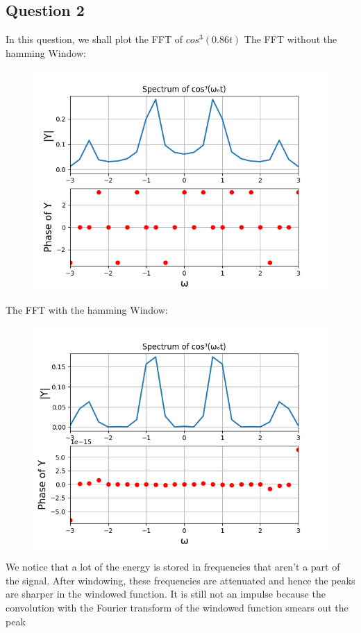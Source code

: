 \documentclass{article}
\begin{document}
\subsection{Question 2}
In this question, we shall plot the FFT of $cos^3(0.86t)$
The FFT without the hamming Window:
\begin{figure}[h!]
\centering
\includegraphics[scale=0.6]{q2.png}
\label{fig:universe}
\end{figure}
\clearpage
The FFT with the hamming Window:
\begin{figure}[h!]
\centering
\includegraphics[scale=0.6]{q2(1).png}
\label{fig:universe}
\end{figure}
\clearpage
We notice that a lot of the energy is stored in frequencies that aren't a part of the signal. After windowing, these frequencies are attenuated and hence the peaks are sharper in the windowed function. It is still not an impulse because the convolution with the Fourier transform of the windowed function smears out the peak
\end{document}
